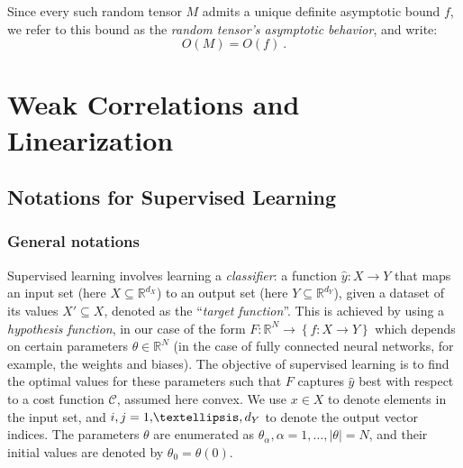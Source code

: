 \documentclass{article} %
\begin{document}
Since every such random tensor \(M\) admits a unique definite asymptotic bound \(f\), we refer to this bound as the \textit{random tensor’s asymptotic behavior}, and write:
\begin{equation}
O(M)=O(f) \ .
\end{equation}

\section{Weak Correlations and Linearization}
\label{sec:WeakCorAndLin}

\subsection{Notations for Supervised Learning}
\label{sec:Notations}

\subsubsection{General notations}
\label{sec:Notations:Gen}

Supervised learning involves learning a \textit{classifier}: a function \(\hat{y}:X\rightarrow Y\) that maps an input set (here $X\subseteq\mathbb{R}^{d_X}$) to an output set (here $Y\subseteq\mathbb{R}^{d_Y}$), given a dataset of its values $X'\subseteq X$, denoted as the ``\textit{target function}''. This is achieved by using a \textit{hypothesis function}, in our case of the form \(F:\mathbb{R}^{N}\rightarrow\left\{ f:X\rightarrow Y\right\}\) which depends on certain parameters \(\theta\in\mathbb{R}^{N}\) (in the case of fully connected neural networks, for example, the weights and biases). The objective of supervised learning is to find the optimal values for these parameters such that \(F\) captures \(\hat{y}\) best with respect to a cost function \(\mathcal{C}\), assumed here convex.
We use $x\in X$ to denote elements in the input set, and $i,j=1\textcolor{black}{,}\ldots,d_Y$ to denote the output vector indices. The parameters \(\theta\) are enumerated as $\theta_{\alpha}, \alpha=1,\ldots,|\theta|=N$, and their initial values are denoted by \(\theta_0=\theta(0)\). 
\end{document}
